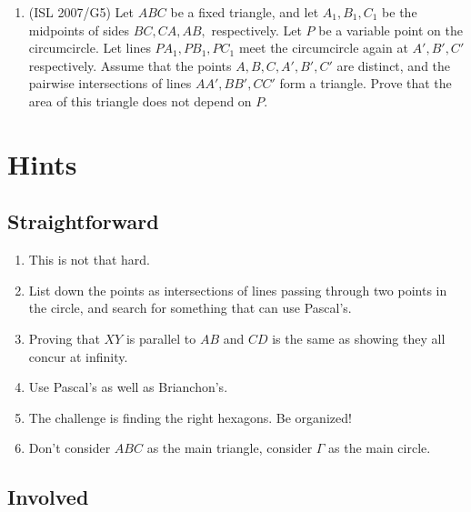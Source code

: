 \documentclass[11pt,paper=letter]{scrartcl}
\begin{document}
\begin{enumerate}
\item (ISL 2007/G5) Let $ABC$ be a fixed triangle, and let $A_1, B_1, C_1$ be the midpoints of sides $BC, CA, AB,$ respectively. Let $P$ be a variable point on the circumcircle. Let lines $PA_1, PB_1, PC_1$ meet the circumcircle again at $A', B', C'$ respectively. Assume that the points $A, B, C, A', B', C'$ are distinct, and the pairwise intersections of lines $AA', BB', CC'$ form a triangle. Prove that the area of this triangle does not depend on $P$.

\end{enumerate}

\section{Hints}

\subsection{Straightforward}

\begin{enumerate}

\item This is not that hard.

\item List down the points as intersections of lines passing through two points in the circle, and search for something that can use Pascal's.

\item Proving that $XY$ is parallel to $AB$ and $CD$ is the same as showing they all concur at infinity.

\item Use Pascal's as well as Brianchon's.

\item The challenge is finding the right hexagons. Be organized!

\item Don't consider $ABC$ as the main triangle, consider $\Gamma$ as the main circle.

\end{enumerate}

\subsection{Involved}
\end{document}
